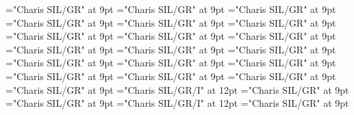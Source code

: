 \documentclass[gps1,twoside]{article}
\begin{document}
\font\variantformentrybackrefssubentrysubentriesentrybefore="Charis SIL/GR" at 9pt
\font\variantformentrybackrefssubentrysubentriesentryafter="Charis SIL/GR" at 9pt
\font\variantentrytypevariantentrytypevariantentrytypesvariantformentrybackrefvariantformentrybackrefssubentrysubentriesentrybefore="Charis SIL/GR" at 9pt
\font\variantentrytypesvariantformentrybackrefvariantformentrybackrefssubentrysubentriesentryafter="Charis SIL/GR" at 9pt
\font\spanspanreverseabbrvariantentrytypevariantentrytypesvariantformentrybackrefvariantformentrybackrefssubentrysubentriesentrybefore="Charis SIL/GR" at 9pt
\font\spanreverseabbrvariantentrytypevariantentrytypesvariantformentrybackrefvariantformentrybackrefssubentrysubentriesentrylastchildafter="Charis SIL/GR" at 9pt
\font\spanspanheadwordvariantformentrybackrefvariantformentrybackrefssubentrysubentriesentrybefore="Charis SIL/GR" at 9pt
\font\spanspanowningentrysummarydefinitionvariantformentrybackrefvariantformentrybackrefssubentrysubentriesentrybefore="Charis SIL/GR" at 9pt
\font\spanowningentrysummarydefinitionvariantformentrybackrefvariantformentrybackrefssubentrysubentriesentrylastchildafter="Charis SIL/GR" at 9pt
\font\etymologysubentrysubentriesentrybefore="Charis SIL/GR" at 9pt
\font\etymologysubentrysubentriesentryafter="Charis SIL/GR" at 9pt
\font\spanspanformetymologysubentrysubentriesentrybefore="Charis SIL/GR" at 9pt
\font\spanformetymologysubentrysubentriesentrylastchildafter="Charis SIL/GR" at 9pt
\font\spanspanglossetymologysubentrysubentriesentrybefore="Charis SIL/GR" at 9pt
\font\spanglossetymologysubentrysubentriesentrylastchildafter="Charis SIL/GR" at 9pt
\font\spanspancommentetymologysubentrysubentriesentrybefore="Charis SIL/GR" at 9pt
\font\spancommentetymologysubentrysubentriesentrylastchildafter="Charis SIL/GR" at 9pt
\font\spanspanminimallexreferencessubentrysubentriesentrybefore="Charis SIL/GR" at 9pt
\font\minimallexreferencessubentrysubentriesentryafter="Charis SIL/GR" at 9pt
\font\spanenownertypeabbreviationminimallexreferenceminimallexreferencessubentrysubentriesentry="Charis SIL/GR/I" at 12pt
\font\spanspanownertypeabbreviationminimallexreferenceminimallexreferencessubentrysubentriesentrybefore="Charis SIL/GR" at 9pt
\font\spanownertypeabbreviationminimallexreferenceminimallexreferencessubentrysubentriesentrylastchildafter="Charis SIL/GR" at 9pt
\font\spanownertypeabbreviationminimallexreferenceminimallexreferencessubentrysubentriesentry="Charis SIL/GR/I" at 12pt
\font\configtargetconfigtargetconfigtargetsminimallexreferenceminimallexreferencessubentrysubentriesentrybefore="Charis SIL/GR" at 9pt
\end{document}
